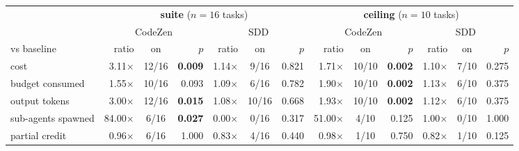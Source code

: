 
\begin{tabular}{@{}lrcrrcrrcrrcr@{}}
\toprule
 & \multicolumn{6}{c}{\textbf{suite} ($n = 16$ tasks)} & \multicolumn{6}{c}{\textbf{ceiling} ($n = 10$ tasks)} \\
\cmidrule(lr){2-7}\cmidrule(lr){8-13}
 & \multicolumn{3}{c}{CodeZen} & \multicolumn{3}{c}{SDD} & \multicolumn{3}{c}{CodeZen} & \multicolumn{3}{c}{SDD} \\
\cmidrule(lr){2-4}\cmidrule(lr){5-7}\cmidrule(lr){8-10}\cmidrule(lr){11-13}
vs baseline & ratio & on & $p$ & ratio & on & $p$ & ratio & on & $p$ & ratio & on & $p$ \\
\midrule
cost & 3.11$\times$ & 12/16 & \textbf{0.009} & 1.14$\times$ & 9/16 & 0.821 & 1.71$\times$ & 10/10 & \textbf{0.002} & 1.10$\times$ & 7/10 & 0.275 \\
budget consumed & 1.55$\times$ & 10/16 & 0.093 & 1.09$\times$ & 6/16 & 0.782 & 1.90$\times$ & 10/10 & \textbf{0.002} & 1.13$\times$ & 6/10 & 0.375 \\
output tokens & 3.00$\times$ & 12/16 & \textbf{0.015} & 1.08$\times$ & 10/16 & 0.668 & 1.93$\times$ & 10/10 & \textbf{0.002} & 1.12$\times$ & 6/10 & 0.375 \\
sub-agents spawned & 84.00$\times$ & 6/16 & \textbf{0.027} & 0.00$\times$ & 0/16 & 0.317 & 51.00$\times$ & 4/10 & 0.125 & 1.00$\times$ & 0/10 & 1.000 \\
partial credit & 0.96$\times$ & 6/16 & 1.000 & 0.83$\times$ & 4/16 & 0.440 & 0.98$\times$ & 1/10 & 0.750 & 0.82$\times$ & 1/10 & 0.125 \\
\bottomrule
\end{tabular}

